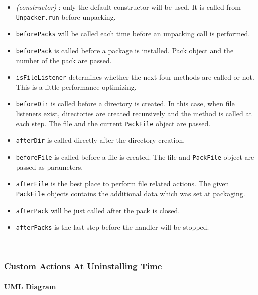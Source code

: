 \begin{itemize}

  \item \textit{(constructor)} : only the default constructor will
  be used. It is called from \texttt{Unpacker.run} before unpacking.

  \item \texttt{beforePacks} will be called each time before an unpacking
  call is performed.

  \item \texttt{beforePack} is called before a package is
  installed. Pack object and the number of the pack are passed.

  \item \texttt{isFileListener} determines whether the next four
  methods are called or not. This is a little performance optimizing.

  \item \texttt{beforeDir} is called before a directory is created.
  In this case, when file listeners exist, directories are created
  recursively and the method is called at each step. The file and the
  current \texttt{PackFile} object are passed.
  \item \texttt{afterDir} is called directly after the directory
  creation.
  \item \texttt{beforeFile} is called before a file is created. The file
  and \texttt{PackFile} object are passed as parameters.
  \item \texttt{afterFile} is the best place to perform file
  related actions. The given \texttt{PackFile} objects contains
  the additional data which was set at packaging.
  \item \texttt{afterPack} will be just called after the pack is
  closed.
  \item \texttt{afterPacks} is the last step before the handler
  will be stopped.
\end{itemize}\

\subsubsection{Custom Actions At Uninstalling Time}

\paragraph{UML Diagram}

\begin{center}
\end{center}\

